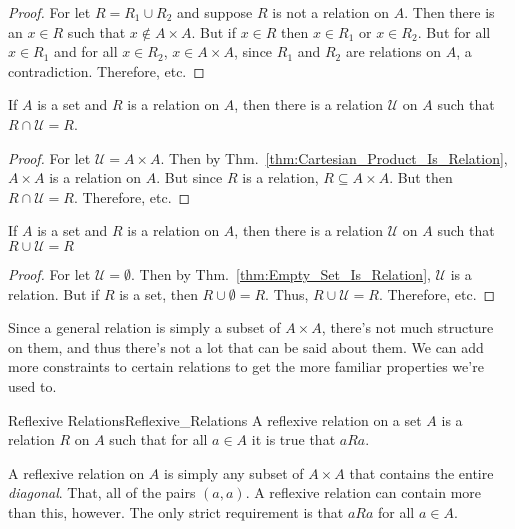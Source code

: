     \begin{proof}
        For let $R=R_{1}\cup{R}_{2}$ and suppose $R$ is not a
        relation on $A$. Then there is an $x\in{R}$ such that
        $x\notin{A}\times{A}$. But if $x\in{R}$ then
        $x\in{R}_{1}$ or $x\in{R}_{2}$. But for all $x\in{R}_{1}$
        and for all $x\in{R}_{2}$,
        $x\in{A}\times{A}$, since $R_{1}$ and $R_{2}$ are
        relations on $A$, a contradiction. Therefore, etc.
    \end{proof}
    \begin{theorem}
        If $A$ is a set and $R$ is a relation on $A$, then there
        is a relation $\mathcal{U}$ on $A$ such that
        $R\cap\mathcal{U}=R$.
    \end{theorem}
    \begin{proof}
        For let $\mathcal{U}={A}\times{A}$. Then by
        Thm.~\ref{thm:Cartesian_Product_Is_Relation}, $A\times{A}$ is
        a relation on $A$. But since $R$ is a relation,
        $R\subseteq{A}\times{A}$. But then
        $R\cap\mathcal{U}=R$. Therefore, etc.
    \end{proof}
    \begin{theorem}
        If $A$ is a set and $R$ is a relation on $A$, then there
        is a relation $\mathcal{U}$ on $A$ such that
        $R\cup\mathcal{U}=R$
    \end{theorem}
    \begin{proof}
        For let $\mathcal{U}=\emptyset$. Then by
        Thm.~\ref{thm:Empty_Set_Is_Relation},
        $\mathcal{U}$ is a relation. But if $R$ is a set, then
        $R\cup\emptyset=R$. Thus, $R\cup\mathcal{U}=R$.
        Therefore, etc.
    \end{proof}
    Since a general relation is simply a subset of $A\times{A}$,
    there's not much structure on them, and thus there's not a lot
    that can be said about them. We can add more constraints to
    certain relations to get the more familiar properties
    we're used to.
    \begin{fdefinition}{Reflexive Relations}{Reflexive_Relations}
        A reflexive relation on a set $A$ is a
        relation $R$ on $A$ such that for all $a\in{A}$
        it is true that $aRa$.
    \end{fdefinition}
    A reflexive relation on $A$ is simply any subset of
    $A\times{A}$ that contains the entire \textit{diagonal}. That,
    all of the pairs $(a,a)$. A reflexive relation can contain more
    than this, however. The only strict requirement is that
    $aRa$ for all $a\in{A}$.
